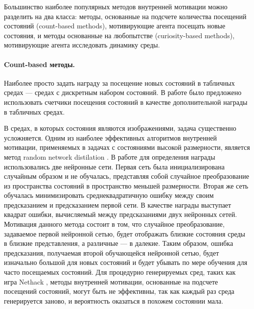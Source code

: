 Большинство наиболее популярных методов внутренней мотивации можно разделить на два класса: методы, основанные на подсчете количества посещений состояний (count-based methods), мотивирующие агента посещать новые состояния, и методы основанные на любопытстве (curiosity-based methods), мотивирующие агента исследовать динамику среды. 

\paragraph{Count-based методы.} Наиболее просто задать награду за посещение новых состояний в табличных средах --- средах с дискретным набором состояний. В работе \cite{Strehl2008} было предложено использовать счетчики посещения состояний в качестве дополнительной награды в табличных средах. 

В средах, в которых состояния являются изображениями, задача существенно усложняется. Одним из наиболее эффективных алгоритмов внутренней мотивации, применяемых в задачах с состояниями высокой размерности, является метод random network distilation \cite{rnd}.
В работе \cite{rnd} для определения награды использовались две нейронные сети. Первая сеть была инициализирована случайным образом и не обучалась, представляя собой случайное преобразование из пространства состояний в пространство меньшей размерности. Вторая же сеть обучалась минимизировать среднеквадратичную ошибку между своим предсказанием и предсказанием первой сети. В качестве награды выступает квадрат ошибки, вычисляемый между предсказаниями двух нейронных сетей. Мотивация данного метода состоит в том, что случайное преобразование, задаваемое первой нейронной сетью, будет отображать близкие состояния среды в близкие представления, а различные --- в далекие. Таким образом, ошибка предсказания, получаемая второй обучающейся нейронной сетью, будет изначально большой для новых состояний и будет убывать по мере обучения для часто посещаемых состояний. 
Для процедурно генерируемых сред, таких как игра Nethack \cite{nethack}, методы внутренней мотивации, основанные на подсчете посещений состояний, могут быть не эффективны, так как каждый раз среда генерируется заново, и вероятность оказаться в похожем состоянии мала.

